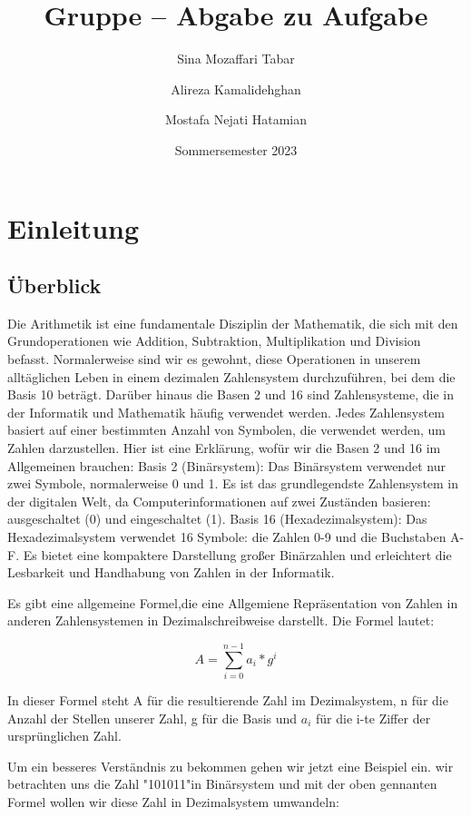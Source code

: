 \documentclass[course=erap]{aspdoc}
\author{Sina Mozaffari Tabar \and Alireza Kamalidehghan  \and Mostafa Nejati Hatamian}
\date{Sommersemester 2023} %
\title{Gruppe \theGroup{} -- Abgabe zu Aufgabe \theNumber}
\begin{document}
\maketitle

\section{Einleitung}
\subsection{Überblick}
Die Arithmetik ist eine fundamentale Disziplin der Mathematik, die sich mit den Grundoperationen wie Addition, Subtraktion, Multiplikation und Division befasst. Normalerweise sind wir es gewohnt, diese Operationen in unserem alltäglichen Leben in einem dezimalen Zahlensystem durchzuführen, bei dem die Basis 10 beträgt.
\newline
Darüber hinaus die Basen 2 und 16 sind Zahlensysteme, die in der Informatik und Mathematik häufig verwendet werden. Jedes Zahlensystem basiert auf einer bestimmten Anzahl von Symbolen, die verwendet werden, um Zahlen darzustellen. Hier ist eine Erklärung, wofür wir die Basen 2 und 16 im Allgemeinen brauchen:
\newline
\newline
Basis 2 (Binärsystem):
Das Binärsystem verwendet nur zwei Symbole, normalerweise 0 und 1. Es ist das grundlegendste Zahlensystem in der digitalen Welt, da Computerinformationen auf zwei Zuständen basieren: ausgeschaltet (0) und eingeschaltet (1).
\newline
\newline
Basis 16 (Hexadezimalsystem):
Das Hexadezimalsystem verwendet 16 Symbole: die Zahlen 0-9 und die Buchstaben A-F. Es bietet eine kompaktere Darstellung großer Binärzahlen und erleichtert die Lesbarkeit und Handhabung von Zahlen in der Informatik.
\newline
\par
Es gibt eine allgemeine Formel,die eine Allgemiene Repräsentation von Zahlen in anderen Zahlensystemen in Dezimalschreibweise darstellt. Die Formel lautet:

$$A = \sum_{i=0} ^{n-1} a_i * g^i$$

In dieser Formel steht A für die resultierende Zahl im Dezimalsystem, n für die Anzahl der Stellen unserer Zahl, g für die Basis und $a_i$ für die i-te Ziffer der ursprünglichen Zahl.
\newline

Um ein besseres Verständnis zu bekommen gehen wir jetzt eine Beispiel ein. wir betrachten uns die Zahl "101011"\space in Binärsystem und mit der oben gennanten Formel wollen wir diese Zahl in Dezimalsystem umwandeln: 
\end{document}
